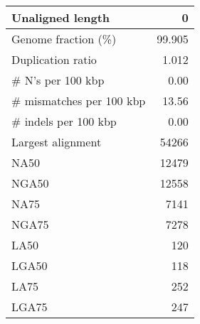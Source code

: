 \documentclass[12pt,a4paper]{article}
\begin{document}
\begin{table}[ht]
\begin{center}
\begin{tabular}{|l*{1}{|r}|}
Unaligned length & 0 \\ \hline
Genome fraction (\%) & 99.905 \\ \hline
Duplication ratio & 1.012 \\ \hline
\# N's per 100 kbp & 0.00 \\ \hline
\# mismatches per 100 kbp & 13.56 \\ \hline
\# indels per 100 kbp & 0.00 \\ \hline
Largest alignment & 54266 \\ \hline
NA50 & 12479 \\ \hline
NGA50 & 12558 \\ \hline
NA75 & 7141 \\ \hline
NGA75 & 7278 \\ \hline
LA50 & 120 \\ \hline
LGA50 & 118 \\ \hline
LA75 & 252 \\ \hline
LGA75 & 247 \\ \hline
\end{tabular}
\end{center}
\end{table}
\end{document}
